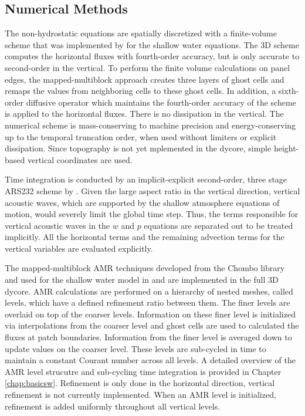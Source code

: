 \subsection{Numerical Methods}
The non-hydrostatic equations are spatially discretized with a finite-volume scheme 
that was implemented by \cite{mccorquodale2015adaptive} for the shallow water equations.
The 3D scheme computes the horizontal fluxes with fourth-order accuracy, but is only accurate
to second-order in the vertical.  To perform the finite volume calculations on panel edges, the 
mapped-multiblock approach creates three layers of ghost cells 
and remaps the values from neighboring cells to these ghost cells. 
 In addition, a sixth-order diffusive operator which maintains the fourth-order 
 accuracy of the scheme is applied to the horizontal fluxes. 
There is no dissipation in the vertical. The numerical scheme is 
mass-conserving to machine precision and energy-conserving up to the
temporal truncation order, when used without limiters or explicit
dissipation. Since topography is not yet mplemented in the dycore, 
simple height-based vertical coordinates are used.

Time integration is conducted by an implicit-explicit second-order, three stage 
ARS232 scheme by \cite{ascher1997implicit}. Given the 
large aspect ratio in the vertical direction, vertical acoustic waves, which are supported by
the shallow atmosphere equations of motion, would severely limit the global time step.
Thus, the terms responsible for vertical acoustic waves in the $w$ and $p$ equations are separated out to
be treated implicitly. All the horizontal terms and the remaining advection terms for the vertical
variables are evaluated explicitly.

The mapped-multiblock AMR techniques developed from the Chombo library \citep{Adams:2015gd} 
and used for the shallow water model in \cite{mccorquodale2015adaptive} and \cite{ferguson2016analyzing}
are implemented in the full 3D dycore.
AMR calculations are performed on a hierarchy of nested meshes, called
levels, which have a defined refinement ratio between them. 
The finer levels are overlaid on top of the coarser levels.  Information on these finer
level is initialized via interpolations from the coarser level and ghost cells 
are used to calculated the fluxes at patch boundaries. Information from the finer level
is averaged down to update values on the coarser level.
These levels are sub-cycled in time to maintain a constant Courant
number across all levels. A detailed overview of the AMR level strucutre and
sub-cycling time integration is provided in Chapter \ref{chap:basicsw}.
Refinement is only done in the horizontal direction, vertical refinement is not currently implemented. 
When an AMR level is initialized, refinement is added uniformly throughout all
vertical levels.

